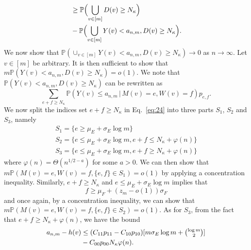 \documentclass[10pt,journal,compsoc]{IEEEtran}
\theoremstyle{definition}
\begin{document}
\begin{IEEEproof}[Lemma~8]
\begin{IEEEproof}[Eq.~\eqref{eq:30}]
\begin{equation*}
\begin{split}
      & \geq \mathbb{P}\Bigl(\bigcup_{v \in [m]} D(v) \geq
      N_\kappa\Bigr) \\ &- \mathbb{P}\Bigl( \bigcup_{v
        \in [m]} Y(v) < a_{n,m}, D(v) \geq N_\kappa\Bigr).
    \end{split}
  \end{equation*}
  We now show that $\mathbb{P}( \cup_{v
        \in [m]} Y(v) < a_{n,m}, D(v) \geq N_\kappa) \rightarrow 0$ as
      $n \rightarrow \infty$. Let $v \in [m]$ be arbitrary. It is then
      sufficient to show that $m\mathbb{P}(Y(v) < a_{n,m}, D(v) \geq
      N_{\kappa}) = o(1)$. We note that $\mathbb{P}(Y(v) < a_{n,m}, D(v) \geq
      N_{\kappa})$ can be rewritten as
      \begin{equation}
        \label{eq:24}
        \sum_{e + f \geq N_{\kappa}}{\mathbb{P}(Y(v) \leq a_{n,m} \, |
          \, M(v) = e, W(v) =
          f)}p_{e,f}.
      \end{equation}
We now split the indices set $e + f \geq N_{\kappa}$ in
Eq.~\eqref{eq:24} into three parts $S_1$, $S_2$ and $S_3$, namely
\begin{gather}
  \label{eq:32}
    S_1 = \{  e \geq
        \mu_E + \sigma_E \log{m}\} \\
    S_2 = \{  e \leq
        \mu_E + \sigma_E \log{m},e + f \leq
        N_\kappa + \varphi(n)\} \\
    S_3 = \{ e \leq \mu_E + \sigma_E \log{m}, e + f \geq
        N_\kappa + \varphi(n)\}
\end{gather}
where $\varphi(n) = \Theta(n^{1/2 - a})$ for some $a > 0$. We can then
show that $m\mathbb{P}(M(v) = e,
W(v) =f, \{e,f\} \in S_1) = o(1)$ by applying a concentration
inequality. Similarly, $e + f \geq N_{\kappa}$ and $e \leq \mu_{E}
+ \sigma_{E} \log{m}$ implies that
\begin{equation}
  \label{eq:33}
  f \geq \mu_{F} + (z_{m} - o(1)) \sigma_F 
\end{equation}
and once again, by a concentration inequality, we can show that $m
\mathbb{P}(M(v) = e, W(v) = f, \{e,f\} \in S_2) = o(1)$. As for
$S_3$, from the fact that $e + f \geq N_{\kappa} + \varphi(n)$, we have the bound
  \begin{equation}
    \begin{split}
    a_{n,m} - h(v) &\leq (C_{11} p_{11} - C_{10} p_{10})[m \sigma_E
    \log{m} + \tbinom{\log{m}}{2}] \\ &- C_{00}p_{00} N_\kappa
    \varphi(n).
    \end{split}
  \end{equation}

\end{IEEEproof}
\end{IEEEproof}
\end{document}
